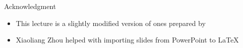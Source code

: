 \documentclass[11pt,aspectratio=169]{beamer}
\begin{document}
  \begin{frame}{Acknowledgment}
   \begin{itemize}
   \setlength{\itemsep}{1em}
    \item This lecture is a slightly modified version of ones prepared by
    \item Xiaoliang Zhou helped with importing slides from PowerPoint to \LaTeX
   \end{itemize}
  \end{frame}
 
\end{document}
